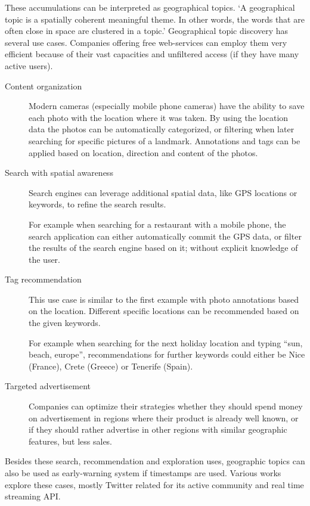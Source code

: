These accumulations can be interpreted as geographical topics. \enquote*{A geographical topic is a spatially coherent meaningful theme. In other words, the words that are often close in space are clustered in a topic.}\cite{Yin2011} Geographical topic discovery has several use cases.\cite{Sizov2010} Companies offering free web-services can employ them very efficient because of their vast capacities and unfiltered access (if they have many active users).
\begin{description}
\item[Content organization] Modern cameras (especially mobile phone cameras) have the ability to save each photo with the location where it was taken. By using the location data the photos can be automatically categorized, or filtering when later searching for specific pictures of a landmark. Annotations and tags can be applied based on location,  direction and content of the photos.

\item[Search with spatial awareness]
Search engines can leverage additional spatial data, like GPS locations or keywords, to refine the search results. 

For example when searching for a restaurant with a mobile phone, the search application can either automatically commit the GPS data, or filter the results of the search engine based on it; without explicit knowledge of the user.

\item[Tag recommendation]%
This use case is similar to the first example with photo annotations based on the location. Different specific locations can be recommended based on the given keywords.

For example when searching for the next holiday location and typing  \enquote{sun, beach, europe}, recommendations for further keywords could either be Nice (France), Crete (Greece) or Tenerife (Spain).

\item[Targeted advertisement]
Companies can optimize their strategies whether they should spend money on advertisement in regions where their product is already well known, or if they should rather advertise in other regions with similar geographic features, but less sales.
\end{description}
%
Besides these search, recommendation and exploration uses, geographic topics can also be used as early-warning system if timestamps are used. Various works explore these cases, mostly Twitter related for its active community and real time streaming API\cite{Vieweg2010, Mendoza2010, Hughes2009}.


